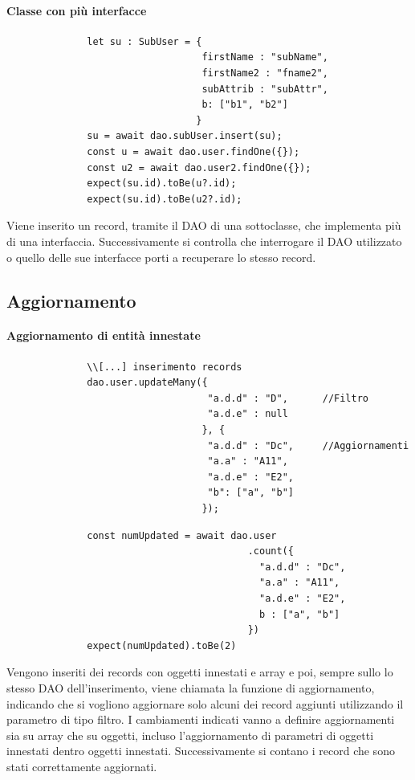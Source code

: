 \documentclass[a4paper, 12pt]{report}
\begin{document}
          \paragraph{Classe con più interfacce}
            \begin{Verbatim}
              let su : SubUser = {
                                  firstName : "subName",
                                  firstName2 : "fname2",
                                  subAttrib : "subAttr",
                                  b: ["b1", "b2"]
                                 }
              su = await dao.subUser.insert(su);
              const u = await dao.user.findOne({});
              const u2 = await dao.user2.findOne({});
              expect(su.id).toBe(u?.id);
              expect(su.id).toBe(u2?.id);
            \end{Verbatim}
            Viene inserito un record, tramite il DAO di una sottoclasse, che implementa più di una interfaccia. Successivamente si controlla che interrogare il DAO utilizzato o quello delle sue interfacce porti a recuperare lo stesso record.
        \subsection{Aggiornamento}
          \paragraph{Aggiornamento di entità innestate}
            \begin{Verbatim}
              \\[...] inserimento records
              dao.user.updateMany({
                                   "a.d.d" : "D",      //Filtro
                                   "a.d.e" : null
                                  }, {
                                   "a.d.d" : "Dc",     //Aggiornamenti
                                   "a.a" : "A11",
                                   "a.d.e" : "E2",
                                   "b": ["a", "b"]
                                  });
            \end{Verbatim}
            \begin{Verbatim}
              const numUpdated = await dao.user
                                          .count({
                                            "a.d.d" : "Dc",
                                            "a.a" : "A11",
                                            "a.d.e" : "E2",
                                            b : ["a", "b"]
                                          })
              expect(numUpdated).toBe(2)
            \end{Verbatim}
            Vengono inseriti dei records con oggetti innestati e array e poi, sempre sullo lo stesso DAO dell'inserimento, viene chiamata la funzione di aggiornamento, indicando che si vogliono aggiornare solo alcuni dei record aggiunti utilizzando il parametro di tipo filtro.
            I cambiamenti indicati vanno a definire aggiornamenti sia su array che su oggetti, incluso l'aggiornamento di parametri di oggetti innestati dentro oggetti innestati.
            Successivamente si contano i record che sono stati correttamente aggiornati.
\end{document}
